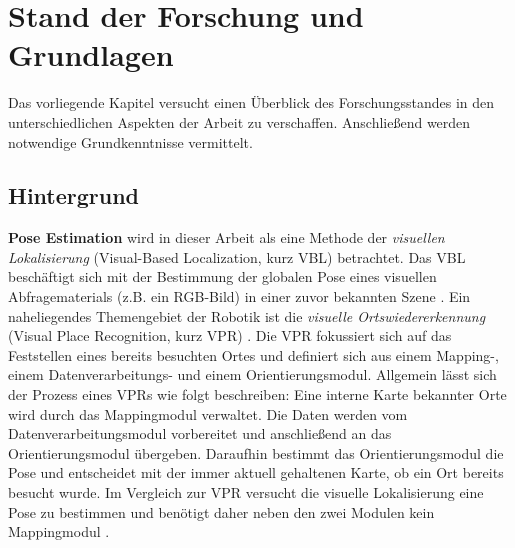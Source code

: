 
\section{Stand der Forschung und Grundlagen}
\label{sec:kapitel_2}
Das vorliegende Kapitel versucht einen Überblick des Forschungsstandes in den unterschiedlichen Aspekten der Arbeit zu verschaffen. Anschließend werden notwendige Grundkenntnisse vermittelt.

\subsection{Hintergrund}


\textbf{Pose Estimation} wird in dieser Arbeit als eine Methode der \textit{visuellen Lokalisierung} (Visual-Based Localization, kurz VBL) betrachtet. Das VBL beschäftigt sich mit der Bestimmung der globalen Pose eines visuellen Abfragematerials (z.B. ein RGB-Bild) in einer zuvor bekannten Szene \cite{piascoSurveyVisualBasedLocalization2018}.
Ein naheliegendes Themengebiet der Robotik ist die \textit{visuelle Ortswiedererkennung} (Visual Place Recognition, kurz VPR) \cite{lowryVisualPlaceRecognition2016}. Die VPR fokussiert sich auf das Feststellen eines bereits besuchten Ortes und definiert sich aus einem Mapping-, einem Datenverarbeitungs- und einem Orientierungsmodul. Allgemein lässt sich der Prozess eines VPRs wie folgt beschreiben: Eine interne Karte bekannter Orte wird durch das Mappingmodul verwaltet. Die Daten werden vom Datenverarbeitungsmodul vorbereitet und anschließend an das Orientierungsmodul übergeben. Daraufhin bestimmt das Orientierungsmodul die Pose und entscheidet mit der immer aktuell gehaltenen Karte, ob ein Ort bereits besucht wurde. Im Vergleich zur VPR versucht die visuelle Lokalisierung eine Pose zu bestimmen und benötigt daher neben den zwei Modulen kein Mappingmodul \cite{lowryVisualPlaceRecognition2016}.

